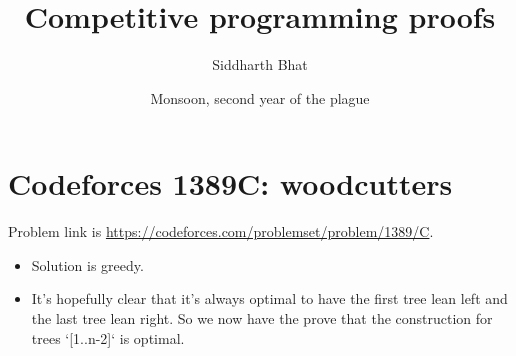 \documentclass[14pt]{report}
\title{Competitive programming proofs}
\author{Siddharth Bhat}
\date{Monsoon, second year of the plague}
\begin{document}
\maketitle
\tableofcontents
\section{Codeforces 1389C: woodcutters}
Problem link is \url{https://codeforces.com/problemset/problem/1389/C}.
\begin{itemize}
\item Solution is greedy.
\item It's hopefully clear that it's always optimal to have the
    first tree lean left and the last tree lean right.  So we now
    have the prove that the construction for trees `[1..n-2]` is
    optimal.


\end{itemize}
\end{document}
